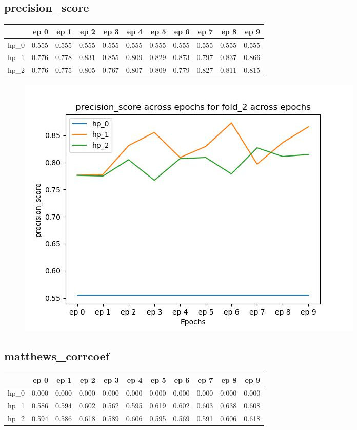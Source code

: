 \documentclass{article}
\begin{document}
\subsection{precision\_score}
\begin{tabular}{lrrrrrrrrrr}
\toprule
{} &   ep 0 &   ep 1 &   ep 2 &   ep 3 &   ep 4 &   ep 5 &   ep 6 &   ep 7 &   ep 8 &   ep 9 \\
\midrule
hp\_0 &  0.555 &  0.555 &  0.555 &  0.555 &  0.555 &  0.555 &  0.555 &  0.555 &  0.555 &  0.555 \\
hp\_1 &  0.776 &  0.778 &  0.831 &  0.855 &  0.809 &  0.829 &  0.873 &  0.797 &  0.837 &  0.866 \\
hp\_2 &  0.776 &  0.775 &  0.805 &  0.767 &  0.807 &  0.809 &  0.779 &  0.827 &  0.811 &  0.815 \\
\bottomrule
\end{tabular}

\begin{figure}[H]
\includegraphics[scale = 0.75]{fold_2/precision_score}
\end{figure}
\subsection{matthews\_corrcoef}
\begin{tabular}{lrrrrrrrrrr}
\toprule
{} &   ep 0 &   ep 1 &   ep 2 &   ep 3 &   ep 4 &   ep 5 &   ep 6 &   ep 7 &   ep 8 &   ep 9 \\
\midrule
hp\_0 &  0.000 &  0.000 &  0.000 &  0.000 &  0.000 &  0.000 &  0.000 &  0.000 &  0.000 &  0.000 \\
hp\_1 &  0.586 &  0.594 &  0.602 &  0.562 &  0.595 &  0.619 &  0.602 &  0.603 &  0.638 &  0.608 \\
hp\_2 &  0.594 &  0.586 &  0.618 &  0.589 &  0.606 &  0.595 &  0.569 &  0.591 &  0.606 &  0.618 \\
\bottomrule
\end{tabular}
\end{document}
